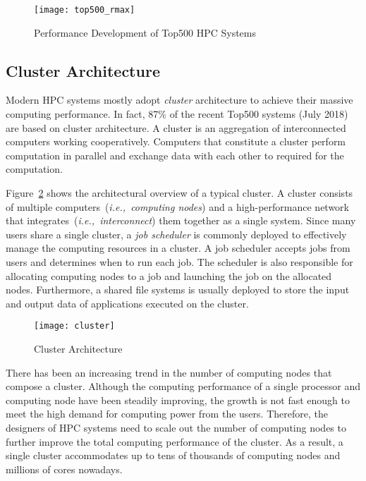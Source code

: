 \begin{figure}
    \centering
    \texttt{[image: top500\_rmax]}
    \caption{Performance Development of Top500 HPC Systems~\autocite{top500}}%
    \label{fig:top500-rmax}
\end{figure}

\subsection{Cluster Architecture}

Modern HPC systems mostly adopt \emph{cluster} architecture to achieve their
massive computing performance. In fact, 87\% of the recent Top500 systems
(July 2018) are based on cluster architecture. A cluster is an aggregation of
interconnected computers working cooperatively. Computers that constitute a
cluster perform computation in parallel and exchange data with each other to
required for the computation.

Figure~\ref{fig:cluster} shows the architectural overview of a typical
cluster. A cluster consists of multiple computers~(\emph{i.e.,\ computing
nodes}) and a high-performance network that integrates~(\emph{i.e.,\
interconnect}) them together as a single system. Since many users share a
single cluster, a \emph{job scheduler} is commonly deployed to effectively
manage the computing resources in a cluster. A job scheduler accepts jobs from
users and determines when to run each job. The scheduler is also responsible
for allocating computing nodes to a job and launching the job on the allocated
nodes. Furthermore, a shared file systems is usually deployed to store the
input and output data of applications executed on the cluster.

\begin{figure}
    \centering
    \texttt{[image: cluster]}
    \caption{Cluster Architecture}%
    \label{fig:cluster}
\end{figure}

There has been an increasing trend in the number of computing nodes that
compose a cluster. Although the computing performance of a single processor
and computing node have been steadily improving, the growth is not fast enough
to meet the high demand for computing power from the users. Therefore, the
designers of HPC systems need to scale out the number of computing nodes to
further improve the total computing performance of the cluster. As a result, a
single cluster accommodates up to tens of thousands of computing nodes and
millions of cores nowadays.

